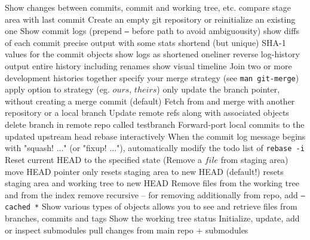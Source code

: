 	{Show changes between commits, commit and working tree, etc.}
	{compare stage area with last commit}
	{Create an empty git repository or reinitialize an existing one}
	{Show commit logs (prepend {\tt --} before path to avoid ambiguousity)}
	{show diffs of each commit}
	{precise output with some stats}
	{shortend (but unique) SHA-1 values for the commit objects }
	{show logs as shortened oneliner}
	{reverse log-history output}
	{entire history including renames}
	{show visual timeline}
	{Join two or more development histories together}
	{specify your merge strategy (see {\tt man git-merge})}
	{apply option to strategy (eg. $ours$, $theirs$)}
	{only update the branch pointer, without creating a merge commit (default)}
	{Fetch from and merge with another re\-pository or a local branch}
	{Update remote refs along with associated objects}
	{delete branch in remote repo called testbranch}
	{Forward-port local commits to the updated upstream head}
	{rebase interactively}
	{When the commit log message begins with "squash! ..." (or "fixup! ..."), automatically modify the todo list of {\tt rebase -i} }
	{Reset current HEAD to the specified state (Remove a $file$ from staging area)}
	{move HEAD pointer only}
	{resets staging area to new HEAD (default!)}
	{resets staging area and working tree to new HEAD}
	{Remove files from the working tree and from the index}
	{remove recursive -- for removing additionally from repo, add
{\tt --cached *}}
	{Show various types of objects}
	{allows you to see and retrieve files from bran\-ches, commits and tags}
	{Show the working tree status}
	{Initialize, update, add or inspect submodules}
	{pull changes from main repo + submodules}

